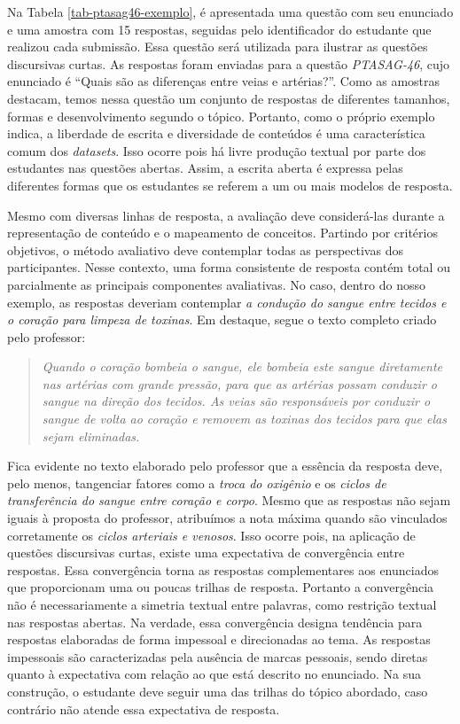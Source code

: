 Na Tabela \ref{tab-ptasag46-exemplo}, é apresentada uma questão com seu enunciado e uma amostra com 15 respostas, seguidas pelo identificador do estudante que realizou cada submissão. Essa questão será utilizada para ilustrar as questões discursivas curtas. As respostas foram enviadas para a questão \textit{PTASAG-46}, cujo enunciado é ``Quais são as diferenças entre veias e artérias?''. Como as amostras destacam, temos nessa questão um conjunto de respostas de diferentes tamanhos, formas e desenvolvimento segundo o tópico. Portanto, como o próprio exemplo indica, a liberdade de escrita e diversidade de conteúdos é uma característica comum dos \textit{datasets}. Isso ocorre pois há livre produção textual por parte dos estudantes nas questões abertas. Assim, a escrita aberta é expressa pelas diferentes formas que os estudantes se referem a um ou mais modelos de resposta. 

Mesmo com diversas linhas de resposta, a avaliação deve considerá-las durante a representação de conteúdo e o mapeamento de conceitos. Partindo por critérios objetivos, o método avaliativo deve contemplar todas as perspectivas dos participantes. Nesse contexto, uma forma consistente de resposta contém total ou parcialmente as principais componentes avaliativas. No caso, dentro do nosso exemplo, as respostas deveriam contemplar \textit{a condução do sangue entre tecidos e o coração para limpeza de toxinas}. Em destaque, segue o texto completo criado pelo professor: 

\begin{quote}
\textit{Quando o coração bombeia o sangue, ele bombeia este sangue diretamente nas artérias com grande pressão, para que as artérias possam conduzir o sangue na direção dos tecidos. As veias são responsáveis por conduzir o sangue de volta ao coração e removem as toxinas dos tecidos para que elas sejam eliminadas.}
\end{quote}

Fica evidente no texto elaborado pelo professor que a essência da resposta deve, pelo menos, tangenciar fatores como a \textit{troca do oxigênio} e os \textit{ciclos de transferência do sangue entre coração e corpo}. Mesmo que as respostas não sejam iguais à proposta do professor, atribuímos a nota máxima quando são vinculados corretamente os \textit{ciclos arteriais e venosos}. Isso ocorre pois, na aplicação de questões discursivas curtas, existe uma expectativa de convergência entre respostas. Essa convergência torna as respostas complementares aos enunciados que proporcionam uma ou poucas trilhas de resposta. Portanto a convergência não é necessariamente a simetria textual entre palavras, como restrição textual nas respostas abertas. Na verdade, essa convergência designa tendência para respostas elaboradas de forma impessoal e direcionadas ao tema. As respostas impessoais são caracterizadas pela ausência de marcas pessoais, sendo diretas quanto à expectativa com relação ao que está descrito no enunciado. Na sua construção, o estudante deve seguir uma das trilhas do tópico abordado, caso contrário não atende essa expectativa de resposta.


